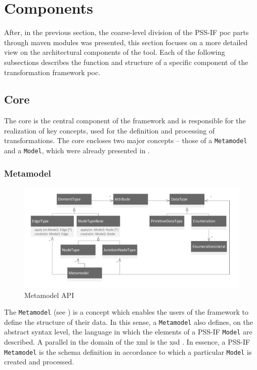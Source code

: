 \section{Components}
\label{sec:impl:components}

After, in the previous section, the coarse-level division of the PSS-IF \gls{poc} parts through maven modules was presented, this section focuses on a more detailed view on the architectural components of the tool. Each of the following subsections describes the function and structure of a specific component of the transformation framework \gls{poc}.

\subsection{Core}

The core is the central component of the framework and is responsible for the realization of key concepts, used for the definition and processing of transformations. The core encloses two major concepts -- those of a \texttt{Metamodel} and a \texttt{Model}, which were already presented in .

\subsubsection{Metamodel}

\begin{figure}
\centering
\includegraphics[width=\textwidth]{figures/metamodel.pdf}
\caption{Metamodel API}
\label{fig:metamodel}
\end{figure}

The \texttt{Metamodel} (see ) is a concept which enables the users of the framework to define the structure of their data. In this sense, a \texttt{Metamodel} also defines, on the abstract syntax level, the language in which the elements of a PSS-IF \texttt{Model} are described. A parallel in the domain of the \gls{xml} is the \gls{xsd} \cite{ref:xsd}. In essence, a PSS-IF \texttt{Metamodel} is the schema definition in accordance to which a particular \texttt{Model} is created and processed.

